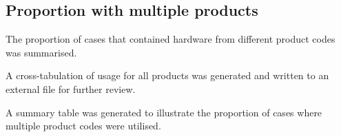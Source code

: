 \documentclass[
]{article}
\begin{document}
\subsection{Proportion with multiple
products}\label{proportion-with-multiple-products}

The proportion of cases that contained hardware from different product
codes was summarised.

A cross-tabulation of usage for all products was generated and written
to an external file for further review.

A summary table was generated to illustrate the proportion of cases
where multiple product codes were utilised.

\begin{table}

\caption{\label{tbl-productusage3}Summary of cross-product usage in the
PRULO dataset}


\end{table}%
\end{document}

